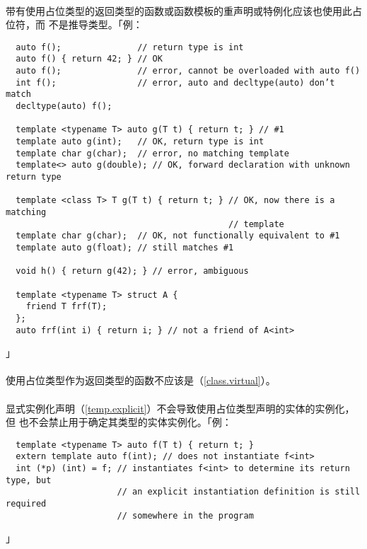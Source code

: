 \paragraph{}
带有使用占位类型的返回类型的函数或函数模板的重声明或特例化应该也使用此占位符，而
不是推导类型。「例：
\begin{lstlisting}
  auto f();               // return type is int
  auto f() { return 42; } // OK
  auto f();               // error, cannot be overloaded with auto f()
  int f();                // error, auto and decltype(auto) don’t match
  decltype(auto) f();

  template <typename T> auto g(T t) { return t; } // #1
  template auto g(int);   // OK, return type is int
  template char g(char);  // error, no matching template
  template<> auto g(double); // OK, forward declaration with unknown return type

  template <class T> T g(T t) { return t; } // OK, now there is a matching
                                            // template
  template char g(char);  // OK, not functionally equivalent to #1
  template auto g(float); // still matches #1

  void h() { return g(42); } // error, ambiguous

  template <typename T> struct A {
    friend T frf(T);
  };
  auto frf(int i) { return i; } // not a friend of A<int>
\end{lstlisting}」

\paragraph{}
使用占位类型作为返回类型的函数不应该是（\ref{class.virtual}）。

\paragraph{}
显式实例化声明（\ref{temp.explicit}）不会导致使用占位类型声明的实体的实例化，但
也不会禁止用于确定其类型的实体实例化。「例：
\begin{lstlisting}
  template <typename T> auto f(T t) { return t; }
  extern template auto f(int); // does not instantiate f<int>
  int (*p) (int) = f; // instantiates f<int> to determine its return type, but
                      // an explicit instantiation definition is still required
                      // somewhere in the program
\end{lstlisting}」

